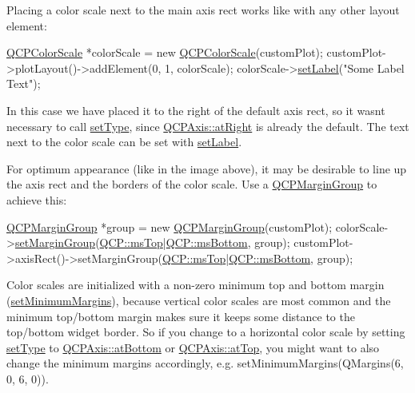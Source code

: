 Placing a color scale next to the main axis rect works like with any other layout element\+: 
\begin{DoxyCode}
\hyperlink{class_q_c_p_color_scale}{QCPColorScale} *colorScale = \textcolor{keyword}{new} \hyperlink{class_q_c_p_color_scale_aa8debce1be38b54287c04d4f584394b4}{QCPColorScale}(customPlot);
customPlot->plotLayout()->addElement(0, 1, colorScale);
colorScale->\hyperlink{class_q_c_p_color_scale_aee124ae8396320cacf8276e9a0fbb8ce}{setLabel}(\textcolor{stringliteral}{"Some Label Text"});
\end{DoxyCode}
 In this case we have placed it to the right of the default axis rect, so it wasn\textquotesingle{}t necessary to call \hyperlink{class_q_c_p_color_scale_a1bf9bdb291927c422dd66b404b206f1f}{set\+Type}, since \hyperlink{class_q_c_p_axis_ae2bcc1728b382f10f064612b368bc18aadf5509f7d29199ef2f263b1dd224b345}{Q\+C\+P\+Axis\+::at\+Right} is already the default. The text next to the color scale can be set with \hyperlink{class_q_c_p_color_scale_aee124ae8396320cacf8276e9a0fbb8ce}{set\+Label}.

For optimum appearance (like in the image above), it may be desirable to line up the axis rect and the borders of the color scale. Use a \hyperlink{class_q_c_p_margin_group}{Q\+C\+P\+Margin\+Group} to achieve this\+: 
\begin{DoxyCode}
\hyperlink{class_q_c_p_margin_group}{QCPMarginGroup} *group = \textcolor{keyword}{new} \hyperlink{class_q_c_p_layout_element_ad077a686e85ab6fa03dcb2fd37fc499a}{QCPMarginGroup}(customPlot);
colorScale->\hyperlink{class_q_c_p_layout_element_a516e56f76b6bc100e8e71d329866847d}{setMarginGroup}(\hyperlink{namespace_q_c_p_a7e487e3e2ccb62ab7771065bab7cae54a5db8fb0d0b0ecf0d611c2602a348e8a0}{QCP::msTop}|\hyperlink{namespace_q_c_p_a7e487e3e2ccb62ab7771065bab7cae54a5241d8eac2bab9524a38889f576179cc}{QCP::msBottom}, group);
customPlot->axisRect()->setMarginGroup(\hyperlink{namespace_q_c_p_a7e487e3e2ccb62ab7771065bab7cae54a5db8fb0d0b0ecf0d611c2602a348e8a0}{QCP::msTop}|\hyperlink{namespace_q_c_p_a7e487e3e2ccb62ab7771065bab7cae54a5241d8eac2bab9524a38889f576179cc}{QCP::msBottom}, group);
\end{DoxyCode}


Color scales are initialized with a non-\/zero minimum top and bottom margin (\hyperlink{class_q_c_p_layout_element_a0a8a17abc16b7923159fcc7608f94673}{set\+Minimum\+Margins}), because vertical color scales are most common and the minimum top/bottom margin makes sure it keeps some distance to the top/bottom widget border. So if you change to a horizontal color scale by setting \hyperlink{class_q_c_p_color_scale_a1bf9bdb291927c422dd66b404b206f1f}{set\+Type} to \hyperlink{class_q_c_p_axis_ae2bcc1728b382f10f064612b368bc18aa220d68888516b6c3b493d144f1ba438f}{Q\+C\+P\+Axis\+::at\+Bottom} or \hyperlink{class_q_c_p_axis_ae2bcc1728b382f10f064612b368bc18aac0ece2b680d3f545e701f75af1655977}{Q\+C\+P\+Axis\+::at\+Top}, you might want to also change the minimum margins accordingly, e.\+g. {\ttfamily set\+Minimum\+Margins(\+Q\+Margins(6, 0, 6, 0))}. 

